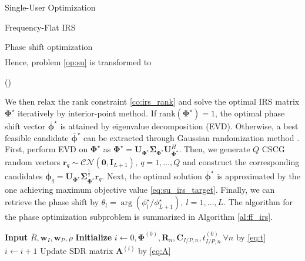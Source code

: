 \documentclass{IEEEtran}
\begin{document}
\begin{section}{Single-User Optimization}
\begin{subsection}{Frequency-Flat IRS}
\begin{subsubsection}{Phase shift optimization}
\begin{equation}
\begin{split}
				\end{split}
			\end{equation}
			Hence, problem \ref{op:su} is transformed to
			\begin{maxi!}
				{\boldsymbol{\boldsymbol{\Phi}}}{(\boldsymbol{\Phi})}{\label{op:su_irs}}{\label{eq:su_irs_target}}
			\end{maxi!}
			We then relax the rank constraint \ref{co:irs_rank} and solve the optimal IRS matrix $\boldsymbol{\Phi}^{\star}$ iteratively by interior-point method. If $\mathrm{rank}(\boldsymbol{\Phi}^{\star})=1$, the optimal phase shift vector $\bar{\boldsymbol{\phi}}^\star$ is attained by eigenvalue decomposition (EVD). Otherwise, a best feasible candidate $\bar{\boldsymbol{\phi}}^\star$ can be extracted through Gaussian randomization method \cite{Huang2010}. First, perform EVD on $\boldsymbol{\Phi}^{\star}$ as $\boldsymbol{\Phi}^{\star}=\boldsymbol{U}_{\boldsymbol{\Phi}^{\star}}\boldsymbol{\Sigma}_{\boldsymbol{\Phi}^{\star}}\boldsymbol{U}_{\boldsymbol{\Phi}^{\star}}^H$. Then, we generate $Q$ CSCG random vectors $\boldsymbol{r}_q \sim \mathcal{CN}(\boldsymbol{0},\boldsymbol{I}_{L+1}),\ q=1,\dots,Q$ and construct the corresponding candidates $\bar{\boldsymbol{\phi}}_q=\boldsymbol{U}_{\boldsymbol{\Phi}^{\star}}\boldsymbol{\Sigma}_{\boldsymbol{\Phi}^{\star}}^{\frac{1}{2}}\boldsymbol{r}_q$. Next, the optimal solution $\bar{\boldsymbol{\phi}}^\star$ is approximated by the one achieving maximum objective value \ref{eq:su_irs_target}. Finally, we can retrieve the phase shift by $\theta_l=\arg(\phi_l^\star/\phi_{L+1}^\star), \ l=1,\dots,L$. The algorithm for the phase optimization subproblem is summarized in Algorithm \ref{al:ff_irs}.
			\begin{algorithm}
				\caption{FF-IRS: Phase Shift Optimization}
				\label{al:ff_irs}
				\begin{algorithmic}[1]
					\State \textbf{Input} $\bar{R},\boldsymbol{w}_I,\boldsymbol{w}_P,\rho$
					\State \textbf{Initialize} $i \leftarrow 0,\boldsymbol{\Phi}^{(0)},\boldsymbol{R}_n,\boldsymbol{C}_{I/P,n},t_{I/P,n}^{(0)}\ \forall n$ by \ref{eq:t}
					\Repeat
					\State $i \leftarrow i + 1$
					\State Update SDR matrix $\boldsymbol{A}^{(i)}$ by \ref{eq:A}

\end{algorithmic}
\end{algorithm}
\end{subsubsection}
\end{subsection}
\end{section}
\end{document}
